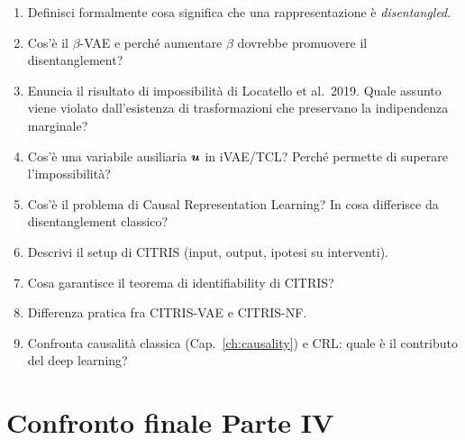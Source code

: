 \begin{tcolorbox}[mywarn, title={Domande d'esame — Causal Representation Learning}]
\begin{enumerate}
  \item Definisci formalmente cosa significa che una rappresentazione è \emph{disentangled}.
  \item Cos'è il $\beta$-VAE e perché aumentare $\beta$ dovrebbe promuovere il disentanglement?
  \item Enuncia il risultato di impossibilità di Locatello et al.\ 2019. Quale assunto viene violato dall'esistenza di trasformazioni che preservano la indipendenza marginale?
  \item Cos'è una variabile ausiliaria $\bm{u}$ in iVAE/TCL? Perché permette di superare l'impossibilità?
  \item Cos'è il problema di Causal Representation Learning? In cosa differisce da disentanglement classico?
  \item Descrivi il setup di CITRIS (input, output, ipotesi su interventi).
  \item Cosa garantisce il teorema di identifiability di CITRIS?
  \item Differenza pratica fra CITRIS-VAE e CITRIS-NF.
  \item Confronta causalità classica (Cap.~\ref{ch:causality}) e CRL: quale è il contributo del deep learning?
\end{enumerate}
\end{tcolorbox}

\chapter*{Confronto finale Parte IV}

